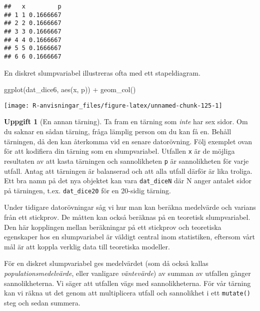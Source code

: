 \documentclass[
]{book}
\newenvironment{Shaded}{\begin{snugshade}}{\end{snugshade}}
\newcommand{\FunctionTok}[1]{\textcolor[rgb]{0.00,0.00,0.00}{#1}}
\newcommand{\NormalTok}[1]{#1}
\newcommand{\SpecialCharTok}[1]{\textcolor[rgb]{0.00,0.00,0.00}{#1}}
\theoremstyle{definition}
\theoremstyle{definition}
\theoremstyle{definition}
\newtheorem{exercise}{Uppgift}[chapter]
\theoremstyle{definition}
\theoremstyle{remark}
\begin{document}
\begin{verbatim}
##   x         p
## 1 1 0.1666667
## 2 2 0.1666667
## 3 3 0.1666667
## 4 4 0.1666667
## 5 5 0.1666667
## 6 6 0.1666667
\end{verbatim}

En diskret slumpvariabel illustreras ofta med ett stapeldiagram.

\begin{Shaded}
\begin{Highlighting}[]
\FunctionTok{ggplot}\NormalTok{(dat\_dice6, }\FunctionTok{aes}\NormalTok{(x, p)) }\SpecialCharTok{+} \FunctionTok{geom\_col}\NormalTok{()}
\end{Highlighting}
\end{Shaded}

\begin{center}\texttt{[image: R-anvisningar\_files/figure-latex/unnamed-chunk-125-1]} \end{center}

\begin{exercise}[En annan tärning]
Ta fram en tärning som \emph{inte} har sex sidor. Om du saknar en sådan tärning, fråga lämplig person om du kan få en. Behåll tärningen, då den kan återkomma vid en senare datorövning. Följ exemplet ovan för att kodifiera din tärning som en slumpvariabel. Utfallen \texttt{x} är de möjliga resultaten av att kasta tärningen och sannolikheten \texttt{p} är sannolikheten för varje utfall. Antag att tärningen är balanserad och att alla utfall därför är lika troliga. Ett bra namn på det nya objektet kan vara \texttt{dat\_diceN} där N anger antalet sidor på tärningen, t.ex. \texttt{dat\_dice20} för en 20-sidig tärning.
\end{exercise}

Under tidigare datorövningar såg vi hur man kan beräkna medelvärde och varians från ett stickprov. De måtten kan också beräknas på en teoretisk slumpvariabel. Den här kopplingen mellan beräkningar på ett stickprov och teoretiska egenskaper hos en slumpvariabel är väldigt central inom statistiken, eftersom vårt mål är att koppla verklig data till teoretiska modeller.

För en diskret slumpvariabel ges medelvärdet (som då också kallas \emph{populationsmedelvärde}, eller vanligare \emph{väntevärde}) av summan av utfallen gånger sannolikheterna. Vi säger att utfallen vägs med sannolikheterna. För vår tärning kan vi räkna ut det genom att multiplicera utfall och sannolikhet i ett \texttt{mutate()} steg och sedan summera.
\end{document}
